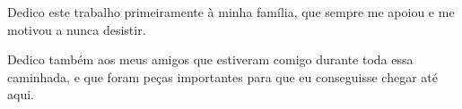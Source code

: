 
\renewcommand{\dedicatorianame}{DEDICATÓRIA}

\begin{dedicatoria}

Dedico este trabalho primeiramente à minha família, que sempre me apoiou e me motivou a nunca desistir.

Dedico também aos meus amigos que estiveram comigo durante toda essa caminhada, e que foram peças importantes para que eu conseguisse chegar até aqui.

\end{dedicatoria}
